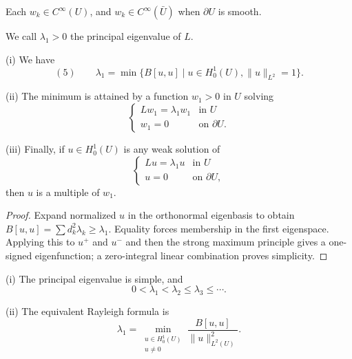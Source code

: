 \begin{remark}
\label{rem:eigenfunctions-smoothness}
Each $w_k\in C^\infty(U)$, and $w_k\in C^\infty(\bar U)$ when $\partial U$ is smooth.
\end{remark}

\begin{definition}
\label{def:principal-eigenvalue}
We call $\lambda_1 > 0$ the principal eigenvalue of $L$.
\end{definition}

\begin{theorem}
\label{thm:variational-principle-principal-eigenvalue}
(i) We have
$$(5) \qquad \lambda_1 = \min\{B[u,u] \mid u \in H_0^1(U), \|u\|_{L^2} = 1\}.$$

(ii) The minimum is attained by a function $w_1>0$ in $U$ solving
$$\begin{cases} Lw_1 = \lambda_1w_1 & \text{in } U \\ w_1 = 0 & \text{on } \partial U. \end{cases}$$

(iii) Finally, if $u \in H_0^1(U)$ is any weak solution of
$$\begin{cases} Lu = \lambda_1u & \text{in } U \\ u = 0 & \text{on } \partial U, \end{cases}$$
then $u$ is a multiple of $w_1$.
\end{theorem}

\begin{proof}
\sketch Expand normalized $u$ in the orthonormal eigenbasis to obtain $B[u,u]=\sum d_k^2\lambda_k\ge\lambda_1$. Equality forces membership in the first eigenspace. Applying this to $u^+$ and $u^-$ and then the strong maximum principle gives a one-signed eigenfunction; a zero-integral linear combination proves simplicity.
\end{proof}

\begin{remark}
\label{rem:principal-eigenvalue-simple-rayleigh}
(i) The principal eigenvalue is simple, and
$$0 < \lambda_1 < \lambda_2 \leq \lambda_3 \leq \cdots.$$

(ii) The equivalent Rayleigh formula is
$$\lambda_1 = \min_{\substack{u \in H_0^1(U) \\ u \neq 0}} \frac{B[u,u]}{\|u\|_{L^2(U)}^2}.$$
\end{remark}

